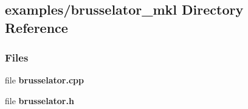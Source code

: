 \subsection{examples/brusselator\+\_\+mkl Directory Reference}
\label{dir_049f19cc038022a8918421bbebc54b48}
\subsubsection*{Files}
\begin{DoxyCompactItemize}
\item 
file {\bf brusselator.\+cpp}
\item 
file {\bf brusselator.\+h}
\end{DoxyCompactItemize}
